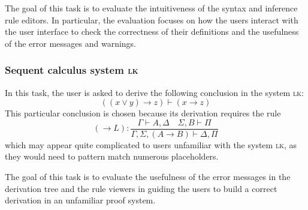The goal of this task is to evaluate the intuitiveness of the syntax and inference rule editors. In particular, the evaluation focuses on how the users interact with the user interface to check the correctness of their definitions and the usefulness of the error messages and warnings.

\subsubsection{Sequent calculus system \textsc{lk}}
In this task, the user is asked to derive the following conclusion in the system \textsc{lk}:
\[
    ((x \lor y) \to z) \vdash (x \to z)
\]
This particular conclusion is chosen because its derivation requires the rule
\[
    (\to L): \frac{\Gamma \vdash A, \Delta \quad \Sigma, B \vdash \Pi}{\Gamma, \Sigma, (A \rightarrow B) \vdash \Delta, \Pi}
\]
which may appear quite complicated to users unfamiliar with the system \textsc{lk}, as they would need to pattern match numerous placeholders.

The goal of this task is to evaluate the usefulness of the error messages in the derivation tree and the rule viewers in guiding the users to build a correct derivation in an unfamiliar proof system.